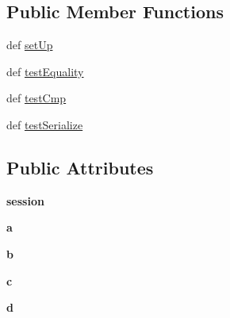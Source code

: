\subsection*{Public Member Functions}
\begin{DoxyCompactItemize}
\item 
def \hyperlink{classcheshire3_1_1test_1_1test_result_set_1_1_simple_result_set_item_test_case_afb156f78f9fb5a99a55c1d473ee298ab}{set\-Up}
\item 
def \hyperlink{classcheshire3_1_1test_1_1test_result_set_1_1_simple_result_set_item_test_case_af4533fa74ac0d354c79dcab73a0e324d}{test\-Equality}
\item 
def \hyperlink{classcheshire3_1_1test_1_1test_result_set_1_1_simple_result_set_item_test_case_a1a5af4b3cee7b2cad683de97922ef015}{test\-Cmp}
\item 
def \hyperlink{classcheshire3_1_1test_1_1test_result_set_1_1_simple_result_set_item_test_case_a8db3c69028d3ef64442dcda7edf87751}{test\-Serialize}
\end{DoxyCompactItemize}
\subsection*{Public Attributes}
\begin{DoxyCompactItemize}
\item 
\hypertarget{classcheshire3_1_1test_1_1test_result_set_1_1_simple_result_set_item_test_case_a46870c550857359009a626c048278ac7}{{\bfseries session}}\label{classcheshire3_1_1test_1_1test_result_set_1_1_simple_result_set_item_test_case_a46870c550857359009a626c048278ac7}

\item 
\hypertarget{classcheshire3_1_1test_1_1test_result_set_1_1_simple_result_set_item_test_case_aafa26004b1c56dc50c543ddfa6027438}{{\bfseries a}}\label{classcheshire3_1_1test_1_1test_result_set_1_1_simple_result_set_item_test_case_aafa26004b1c56dc50c543ddfa6027438}

\item 
\hypertarget{classcheshire3_1_1test_1_1test_result_set_1_1_simple_result_set_item_test_case_ab2636dce5bcc67a614d6a46390cc847a}{{\bfseries b}}\label{classcheshire3_1_1test_1_1test_result_set_1_1_simple_result_set_item_test_case_ab2636dce5bcc67a614d6a46390cc847a}

\item 
\hypertarget{classcheshire3_1_1test_1_1test_result_set_1_1_simple_result_set_item_test_case_a60be96fbe8aac74548f9c6c24ec28df1}{{\bfseries c}}\label{classcheshire3_1_1test_1_1test_result_set_1_1_simple_result_set_item_test_case_a60be96fbe8aac74548f9c6c24ec28df1}

\item 
\hypertarget{classcheshire3_1_1test_1_1test_result_set_1_1_simple_result_set_item_test_case_a26cf77afbff394f2d66ffba5341b6f37}{{\bfseries d}}\label{classcheshire3_1_1test_1_1test_result_set_1_1_simple_result_set_item_test_case_a26cf77afbff394f2d66ffba5341b6f37}

\end{DoxyCompactItemize}


